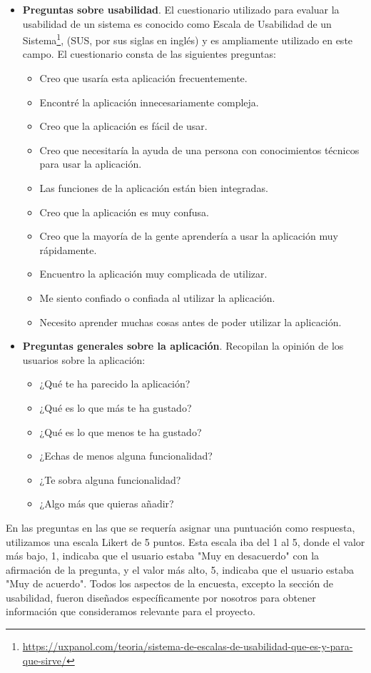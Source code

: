 \begin{itemize}
\begin{itemize}
          \end{itemize}
    \item \textbf{Preguntas sobre usabilidad}. El cuestionario utilizado para evaluar la usabilidad de un sistema es conocido como Escala de Usabilidad de un Sistema\footnote{\url{https://uxpanol.com/teoria/sistema-de-escalas-de-usabilidad-que-es-y-para-que-sirve/}}, (SUS, por sus siglas en inglés) y es ampliamente utilizado en este campo. El cuestionario consta de las siguientes preguntas:
          \begin{itemize}
              \item Creo que usaría esta aplicación frecuentemente.
              \item Encontré la aplicación innecesariamente compleja.
              \item Creo que la aplicación es fácil de usar.
              \item Creo que necesitaría la ayuda de una persona con conocimientos técnicos para usar la aplicación.
              \item Las funciones de la aplicación están bien integradas.
              \item Creo que la aplicación es muy confusa.
              \item Creo que la mayoría de la gente aprendería a usar la aplicación muy rápidamente.
              \item Encuentro la aplicación muy complicada de utilizar.
              \item Me siento confiado o confiada al utilizar la aplicación.
              \item Necesito aprender muchas cosas antes de poder utilizar la aplicación.
          \end{itemize}
    \item \textbf{Preguntas generales sobre la aplicación}. Recopilan la opinión de los usuarios sobre la aplicación:
          \begin{itemize}
              \item ¿Qué te ha parecido la aplicación?
              \item ¿Qué es lo que más te ha gustado?
              \item ¿Qué es lo que menos te ha gustado?
              \item ¿Echas de menos alguna funcionalidad?
              \item ¿Te sobra alguna funcionalidad?
              \item ¿Algo más que quieras añadir?
          \end{itemize}
\end{itemize}

En las preguntas en las que se requería asignar una puntuación como respuesta, utilizamos una escala Likert de 5 puntos. Esta escala iba del 1 al 5, donde el valor más bajo, 1, indicaba que el usuario estaba "Muy en desacuerdo" con la afirmación de la pregunta, y el valor más alto, 5, indicaba que el usuario estaba "Muy de acuerdo". Todos los aspectos de la encuesta, excepto la sección de usabilidad, fueron diseñados específicamente por nosotros para obtener información que consideramos relevante para el proyecto.